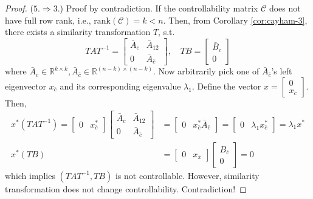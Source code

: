 \documentclass[
]{book}
\theoremstyle{definition}
\theoremstyle{definition}
\theoremstyle{definition}
\theoremstyle{definition}
\theoremstyle{remark}
\begin{document}
\begin{proof}
(\(5. \Rightarrow 3.\)) Proof by contradiction. If the controllability matrix \(\mathcal{C}\) does not have full row rank, i.e., \(\text{rank}(\mathcal{C}) = k < n\). Then, from Corollary \ref{cor:cayham-3}, there exists a similarity transformation \(T\), s.t.
\begin{equation*}
   TAT^{-1} = \begin{bmatrix}
      \bar{A}_{c} & \bar{A}_{12} \\
      0 & \bar{A}_{\bar{c}}
   \end{bmatrix}, \quad TB = \begin{bmatrix}
      \bar{B}_c \\ 0
   \end{bmatrix}
\end{equation*}
where \(\bar{A}_c \in \mathbb{R}^{k \times k}, \bar{A}_{\bar{c}} \in \mathbb{R}^{(n-k) \times (n-k)}\). Now arbitrarily pick one of \(\bar{A}_{\bar{c}}\)'s left eigenvector \(x_{\bar{c}}\) and its corresponding eigenvalue \(\lambda_1\). Define the vector \(x = \begin{bmatrix}  0 \\ x_{\bar{c}} \end{bmatrix}\). Then,
\begin{equation*}
   \begin{split}
      x^* (TAT^{-1}) = \begin{bmatrix}
         0 & x_{\bar{c}}^*
      \end{bmatrix} \begin{bmatrix}
         \bar{A}_{c} & \bar{A}_{12} \\
         0 & \bar{A}_{\bar{c}}
      \end{bmatrix} & = \begin{bmatrix}
         0 & x_{\bar{c}}^* \bar{A}_{\bar{c}}
      \end{bmatrix} = \begin{bmatrix}
         0 & \lambda_1 x_{\bar{c}}^*
      \end{bmatrix} = \lambda_1 x^* \\
      x^* (TB) & = \begin{bmatrix}
         0 & x_{\bar{x}}
      \end{bmatrix} \begin{bmatrix}
         B_{\bar{c}} \\ 0
      \end{bmatrix} = 0
   \end{split}
\end{equation*}
which implies \((TAT^{-1}, TB)\) is not controllable. However, similarity transformation does not change controllability. Contradiction!


\end{proof}
\end{document}

